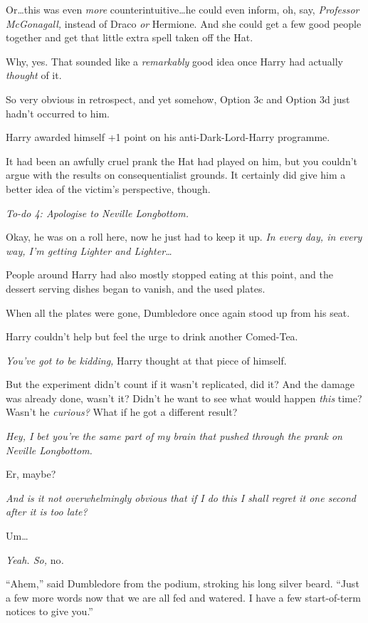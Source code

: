 Or…this was even \emph{more} counterintuitive…he could even
inform, oh, say, \emph{Professor McGonagall,} instead of Draco \emph{or} Hermione. And she could get a few good people together and get that little extra spell taken off the Hat.

Why, yes. That sounded like a \emph{remarkably} good idea once Harry had actually \emph{thought} of it.

So very obvious in retrospect, and yet somehow, Option 3c and Option 3d just hadn’t occurred to him.

Harry awarded himself +1 point on his anti-Dark-Lord-Harry programme.

It had been an awfully cruel prank the Hat had played on him, but you couldn’t argue with the results on consequentialist grounds. It certainly did give him a better idea of the victim’s perspective, though.

\emph{To-do 4: Apologise to Neville Longbottom.}

Okay, he was on a roll here, now he just had to keep it up. \emph{In every day, in every way, I’m getting Lighter and Lighter…}

People around Harry had also mostly stopped eating at this point, and the dessert serving dishes began to vanish, and the used plates.

When all the plates were gone, Dumbledore once again stood up from his seat.

Harry couldn’t help but feel the urge to drink another Comed-Tea.

\emph{You’ve \emph{got} to be kidding,} Harry thought at that piece of himself.

But the experiment didn’t count if it wasn’t replicated, did it? And the damage was already done, wasn’t it? Didn’t he want to see what would happen \emph{this} time? Wasn’t he \emph{curious?} What if he got a different result?

\emph{Hey, I bet you’re the same part of my brain that pushed through the prank on Neville Longbottom.}

Er, maybe?

\emph{And is it not \emph{overwhelmingly} obvious that if I do this I shall regret it one second after it is too late?}

Um…

\emph{Yeah. So,} no\emph{.}

“Ahem,” said Dumbledore from the podium, stroking his long silver beard. “Just a few more words now that we are all fed and watered. I have a few start-of-term notices to give you.”

